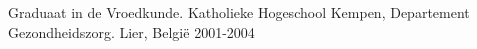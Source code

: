 \begin{cventries}
\cventry
{Graduaat in de Vroedkunde.} %
{Katholieke Hogeschool Kempen, Departement Gezondheidszorg.} %
{Lier, België} %
{2001-2004} %
{ %
}








\end{cventries}